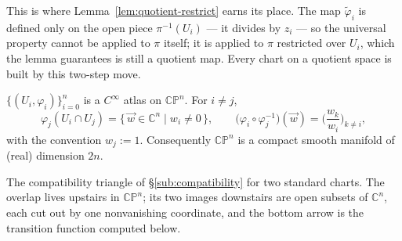 \documentclass[11pt]{report}
\makeatletter
\newcounter{thmcounter}[section]
\newcommand{\thmlabel}[1]{\edef\@currentlabel{\arabic{section}.\arabic{thmcounter}}\label{#1}}
\newcommand{\leeref}[1]{\par\smallskip{\raggedleft\footnotesize\textsc{Lee}:\ #1\par}}
\makeatother
\begin{document}
\begin{rembox}\label{rem:smooth-structures-5}
This is where Lemma~\ref{lem:quotient-restrict} earns its place. The map $\tilde\varphi_i$ is defined only on the open piece $\pi^{-1}(U_i)$ --- it divides by $z_i$ --- so the universal property cannot be applied to $\pi$ itself; it is applied to $\pi$ restricted over $U_i$, which the lemma guarantees is still a quotient map. Every chart on a quotient space is built by this two-step move.
\end{rembox}

\begin{thmbox}\thmlabel{thm:cpn-atlas}
$\{(U_i, \varphi_i)\}_{i=0}^n$ is a $C^\infty$ atlas on $\mathbb{CP}^n$. For $i \neq j$,
\[
\varphi_j(U_i \cap U_j) = \{\, \vec w \in \mathbb{C}^n \mid w_i \neq 0 \,\},
\qquad
\big(\varphi_i \circ \varphi_j^{-1}\big)(\vec w) = \Big( \frac{w_k}{w_i} \Big)_{k \neq i},
\]
with the convention $w_j := 1$.
Consequently $\mathbb{CP}^n$ is a compact smooth manifold of (real) dimension $2n$.
\leeref{Problem 1-9}
\end{thmbox}

\begin{center}
\end{center}

The compatibility triangle of \S\ref{sub:compatibility} for two standard charts. The overlap lives upstairs in $\mathbb{CP}^n$; its two images downstairs are open subsets of $\mathbb{C}^n$, each cut out by one nonvanishing coordinate, and the bottom arrow is the transition function computed below.
\end{document}
